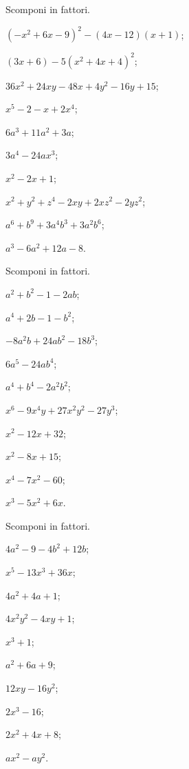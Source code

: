 \begin{esercizio}[\Ast]
 \label{ese:13.112}
 Scomponi in fattori.
\begin{multicols}{2}
 \begin{enumeratea}
\item $(-x^{2}+6x-9)^{2}-(4x-12)(x+1)$;
\item $(3x+6)-5(x^{2}+4x+4)^{2}$;
\item $36x^{2}+24xy-48x+4y^{2}-16y+15$;
\item $x^{5}-2-x+2x^{4}$;
\item $6a^{3}+11a^{2}+3a$;
\item $3a^{4}-24ax^{3}$;
\item $x^{2}-2x+1$;
\item $x^{2}+y^{2}+z^{4}-2xy+2{xz}^{2}-2{yz}^{2}$;
\item $a^{6}+b^{9}+3a^{4}b^{3}+3a^{2}b^{6}$;
\item $a^{3}-6a^{2}+12a-8$.
 \end{enumeratea}
\end{multicols}
\end{esercizio}


\begin{esercizio}
 \label{ese:13.113}
 Scomponi in fattori.
 \begin{multicols}{2}
 \begin{enumeratea}
 \item $a^{2}+b^{2}-1-2{ab}$;
\item $a^{4}+2b-1-b^{2}$;
\item $-8a^{2}b+24{ab}^{2}-18b^{3}$;
\item $6a^{5}-24{ab}^{4}$;
\item $a^{4}+b^{4}-2a^{2}b^{2}$;
\item $x^{6}-9x^{4}y+27x^{2}y^{2}-27y^{3}$;
\item $x^{2}-12x+32$;
\item $x^{2}-8x+15$;
\item $x^{4}-7x^{2}-60$;
\item $x^{3}-5x^{2}+6x$.
 \end{enumeratea}
 \end{multicols}
\end{esercizio}

\begin{esercizio}
 \label{ese:13.114}
 Scomponi in fattori.
 \begin{multicols}{2}
 \begin{enumeratea}
  \item $4a^{2}-9-4b^{2}+12b$;
\item $x^{5}-13x^{3}+36x$;
\item $4a^{2}+4a+1$;
\item $4x^{2}y^{2}-4xy+1$;
\item $x^{3}+1$;
\item $a^{2}+6a+9$;
\item $12xy-16y^{2}$;
\item $2x^{3}-16$;
\item $2x^{2}+4x+8$;
\item $ax^{2}-{ay}^{2}$.
 \end{enumeratea}
 \end{multicols}
\end{esercizio}

